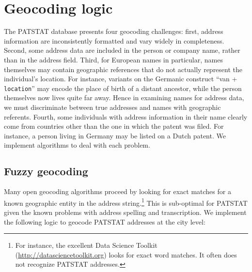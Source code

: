 \documentclass[11pt]{article}
\begin{document}
\FloatBarrier
\section{Geocoding logic}
\label{sec:geocoding-logic}

The PATSTAT database presents four geocoding challenges: first,
address information are inconsistently formatted and vary widely in
completeness. Second, some address data are included in the person or
company name, rather than in the address field. Third, for European
names in particular, names themselves may contain geographic
references that do not actually represent the individual's
location. For instance, variants on the Germanic construct ``van +
\texttt{location}'' may encode the place of birth of a distant
ancestor, while the person themselves now lives quite far away. Hence
in examining names for address data, we must discriminate between true
addresses and names with geographic referents. Fourth, some
individuals with address information in their name clearly come from
countries other than the one in which the patent was filed. For
instance, a person living in Germany may be listed on a Dutch patent. We
implement algorithms to deal with each problem.

\subsection{Fuzzy geocoding}
\label{sec:fuzzy-geocoding}

Many open geocoding algorithms proceed by looking for exact matches
for a known geographic entity in the address string.\footnote{For
instance, the excellent Data Science Toolkit (\url{http://datasciencetoolkit.org}) looks for exact
word matches. It often does not recognize PATSTAT addresses.} This is
sub-optimal for PATSTAT given the known problems with address spelling
and transcription. We implement the following logic to geocode PATSTAT
addresses at the city level:
\end{document}

